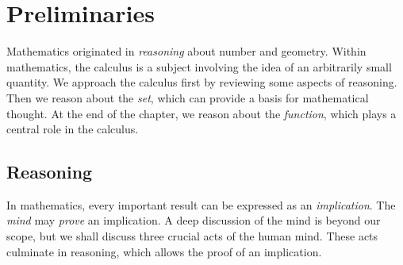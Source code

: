 
\chapter{Preliminaries}

Mathematics originated in \emph{reasoning} about number and geometry. Within
mathematics, the calculus is a subject involving the idea of an arbitrarily
small quantity.  We approach the calculus first by reviewing some aspects of
reasoning. Then we reason about the \emph{set}, which can provide a basis for
mathematical thought.  At the end of the chapter, we reason about the
\emph{function}, which plays a central role in the calculus.

\section{Reasoning}

In mathematics, every important result can be expressed as an
\emph{implication}.  The \emph{mind} may \emph{prove} an implication.  A deep
discussion of the mind is beyond our scope, but we shall discuss three crucial
acts of the human mind.  These acts culminate in reasoning, which allows the
proof of an implication.

